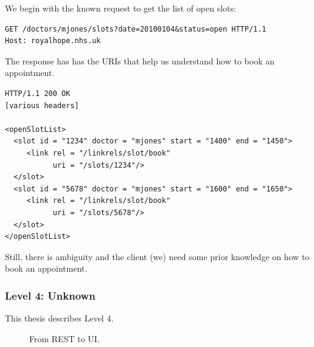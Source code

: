 We begin with the known request to get the list of open slots:

\lstset{language=}
\begin{lstlisting}[caption=Fetching the list of open slots.]
GET /doctors/mjones/slots?date=20100104&status=open HTTP/1.1
Host: royalhope.nhs.uk
\end{lstlisting}

The response has has the URIs that help us understand how to book an appointment.

\lstset{language=}
\begin{lstlisting}[caption=Level 3: The response contains information that helps us to book an appointment.]
HTTP/1.1 200 OK
[various headers]

<openSlotList>
  <slot id = "1234" doctor = "mjones" start = "1400" end = "1450">
     <link rel = "/linkrels/slot/book"
           uri = "/slots/1234"/>
  </slot>
  <slot id = "5678" doctor = "mjones" start = "1600" end = "1650">
     <link rel = "/linkrels/slot/book"
           uri = "/slots/5678"/>
  </slot>
</openSlotList>
\end{lstlisting}

Still, there is ambiguity and the client (we) need some prior knowledge on how to book an appointment.

\subsubsection{Level 4: Unknown}

This thesis describes Level 4.

\begin{figure}[!htb]
  \caption{\label{fig:my-label} From REST to UI.}
\end{figure}

